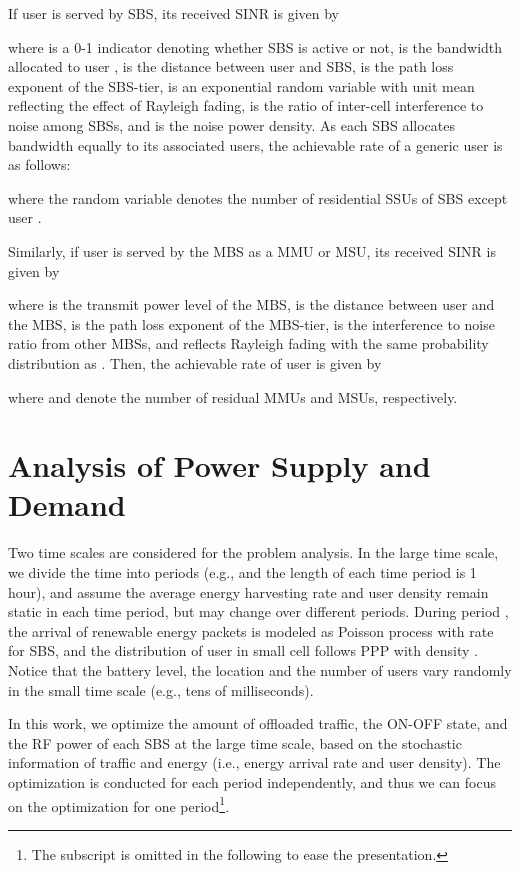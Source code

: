 \documentclass[12pt, draftclsnofoot,onecolumn]{IEEEtran}
\begin{document}
        If user  is served by SBS, its received SINR is given by \cite{Jeffery_fundamental}
            
        where  is a 0-1 indicator denoting whether SBS is active or not,  is the bandwidth allocated to user ,  is the distance between user  and SBS,  is the path loss exponent of the SBS-tier,  is an exponential random variable with unit mean reflecting the effect of Rayleigh fading,  is the ratio of inter-cell interference to noise among SBSs, and  is the noise power density.
        As each SBS allocates bandwidth equally to its associated users, the achievable rate of a generic user  is as follows:
            
        where the random variable  denotes the number of residential SSUs of SBS except user .

        Similarly, if user  is served by the MBS as a MMU or MSU, its received SINR is given by
            
        where  is the transmit power level of the MBS,  is the distance between user  and the MBS,  is the path loss exponent of the MBS-tier,  is the interference to noise ratio from other MBSs, and  reflects Rayleigh fading with the same probability distribution as .
        Then, the achievable rate of user  is given by
            
        where  and  denote the number of residual MMUs and MSUs, respectively.

 \section{Analysis of Power Supply and Demand}
    \label{sec_power_demand_supply}
    Two time scales are considered for the problem analysis.
In the large time scale, we divide the time into  periods (e.g.,  and the length of each time period is 1 hour), and assume the average energy harvesting rate and user density remain static in each time period, but may change over different periods.
During period , the arrival of renewable energy packets is modeled as Poisson process with rate  for SBS, and the distribution of user in small cell  follows PPP with density .
Notice that the battery level, the location and the number of users vary randomly in the small time scale (e.g., tens of milliseconds).

In this work, we optimize the amount of offloaded traffic, the ON-OFF state, and the RF power of each SBS at the large time scale, based on the stochastic information of traffic and energy (i.e., energy arrival rate and user density). 
The optimization is conducted for each period independently, and thus we can focus on the optimization for one period\footnote{The subscript  is omitted in the following to ease the presentation.}.
\end{document}
